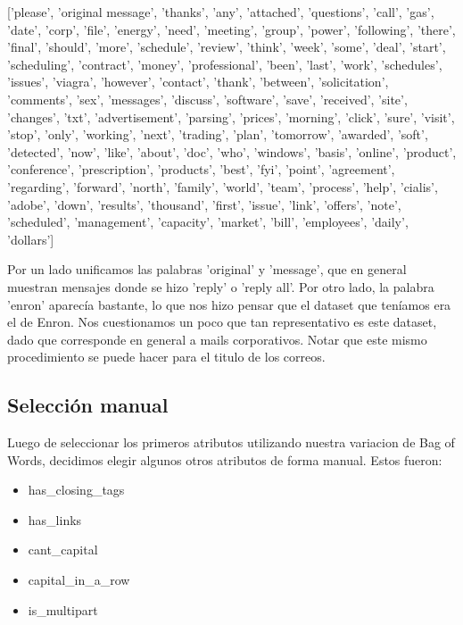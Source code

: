 \documentclass[10pt,a4paper]{article}
\begin{document}
['please', 'original message', 'thanks', 'any', 'attached', 'questions', 'call', 'gas', 'date', 'corp', 'file',
	'energy', 'need', 'meeting', 'group', 'power', 'following', 'there', 'final', 'should', 'more', 'schedule',
	'review', 'think', 'week', 'some', 'deal', 'start', 'scheduling', 'contract', 'money', 'professional', 'been',
	'last', 'work', 'schedules', 'issues', 'viagra', 'however', 'contact', 'thank', 'between', 'solicitation', 'comments',
	'sex', 'messages', 'discuss', 'software', 'save', 'received', 'site', 'changes', 'txt', 'advertisement', 'parsing', 'prices',
	'morning', 'click', 'sure', 'visit', 'stop', 'only', 'working', 'next', 'trading', 'plan', 'tomorrow',
	'awarded', 'soft', 'detected', 'now', 'like', 'about', 'doc', 'who', 'windows', 'basis', 'online', 'product', 'conference',
	'prescription', 'products', 'best', 'fyi', 'point', 'agreement', 'regarding', 'forward', 'north', 'family', 'world', 'team',
	'process', 'help', 'cialis', 'adobe', 'down', 'results', 'thousand', 'first', 'issue', 'link', 'offers', 'note',
	'scheduled', 'management', 'capacity', 'market', 'bill', 'employees', 'daily', 'dollars']

\pagebreak

Por un lado unificamos las palabras 'original' y 'message', que en general muestran mensajes donde se hizo 'reply' o 'reply all'. Por otro lado, la palabra 'enron' aparecía bastante, lo que nos hizo pensar que el dataset que teníamos era el de Enron. Nos cuestionamos un poco que tan representativo es este dataset, dado que corresponde en general a mails corporativos. Notar que este mismo procedimiento se puede hacer para el titulo de los correos.

\subsection{Selección manual}

Luego de seleccionar los primeros atributos utilizando nuestra variacion de Bag of Words, decidimos elegir algunos otros atributos de forma manual. Estos fueron:

\begin{itemize}
	\item has\_closing\_tags
	\item has\_links
	\item cant\_capital
	\item capital\_in\_a\_row
	\item is\_multipart
\end{itemize}
\end{document}
